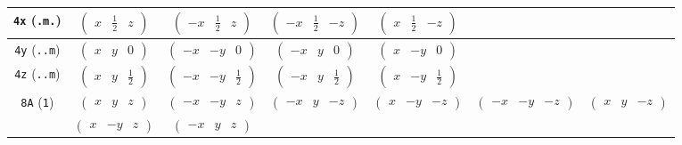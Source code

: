 \documentclass[fleqn,9pt,landscape]{jsarticle}
\begin{document}
\begin{center}
\begin{longtable}{ccccccc}
{\tt 4x} ({\tt .m.}) & $ \begin{pmatrix} x & \frac{1}{2} & z \end{pmatrix} $ & $ \begin{pmatrix} - x & \frac{1}{2} & z \end{pmatrix} $ & $ \begin{pmatrix} - x & \frac{1}{2} & - z \end{pmatrix} $ & $ \begin{pmatrix} x & \frac{1}{2} & - z \end{pmatrix} $ & $  $ & $  $ \\ \hline
{\tt 4y} ({\tt ..m}) & $ \begin{pmatrix} x & y & 0 \end{pmatrix} $ & $ \begin{pmatrix} - x & - y & 0 \end{pmatrix} $ & $ \begin{pmatrix} - x & y & 0 \end{pmatrix} $ & $ \begin{pmatrix} x & - y & 0 \end{pmatrix} $ & $  $ & $  $ \\ \hline
{\tt 4z} ({\tt ..m}) & $ \begin{pmatrix} x & y & \frac{1}{2} \end{pmatrix} $ & $ \begin{pmatrix} - x & - y & \frac{1}{2} \end{pmatrix} $ & $ \begin{pmatrix} - x & y & \frac{1}{2} \end{pmatrix} $ & $ \begin{pmatrix} x & - y & \frac{1}{2} \end{pmatrix} $ & $  $ & $  $ \\ \hline
{\tt 8A} ({\tt 1}) & $ \begin{pmatrix} x & y & z \end{pmatrix} $ & $ \begin{pmatrix} - x & - y & z \end{pmatrix} $ & $ \begin{pmatrix} - x & y & - z \end{pmatrix} $ & $ \begin{pmatrix} x & - y & - z \end{pmatrix} $ & $ \begin{pmatrix} - x & - y & - z \end{pmatrix} $ & $ \begin{pmatrix} x & y & - z \end{pmatrix} $ \\
& $ \begin{pmatrix} x & - y & z \end{pmatrix} $ & $ \begin{pmatrix} - x & y & z \end{pmatrix} $ & $  $ & $  $ & $  $ & $  $ \\
\end{longtable}
\end{center}
\end{document}
